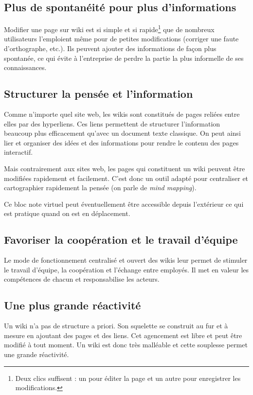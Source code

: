 \documentclass{article}
\begin{document}
\subsection{Plus de spontanéité pour plus d'informations}
Modifier une page sur wiki est si simple et si rapide\footnote{Deux clics suffisent : un pour éditer la page et un autre pour enregistrer les modifications.} que de nombreux utilisateurs l'emploient même pour de petites modifications (corriger une faute d'orthographe, etc.). Ils peuvent ajouter des informations de façon plus spontanée, ce qui évite à l'entreprise de perdre la partie la plus informelle de ses connaissances.

\subsection{Structurer la pensée et l'information}
Comme n'importe quel site web, les wikis sont constitués de pages reliées entre elles par des hyperliens. Ces liens permettent de structurer l'information beaucoup plus efficacement qu'avec un document texte classique. On peut ainsi lier et organiser des idées et des informations pour rendre le contenu des pages interactif.

Mais contrairement aux sites web, les pages qui constituent un wiki peuvent être modifiées rapidement et facilement. C'est donc un outil adapté pour centraliser et cartographier rapidement la pensée (on parle de \emph{mind mapping}).

Ce bloc note virtuel peut éventuellement être accessible depuis l'extérieur ce qui est pratique quand on est en déplacement.

\subsection{Favoriser la coopération et le travail d'équipe}
Le mode de fonctionnement centralisé et ouvert des wikis leur permet de stimuler le travail d'équipe, la coopération et l'échange entre employés. Il met en valeur les compétences de chacun et responsabilise les acteurs.

\subsection{Une plus grande réactivité}
Un wiki n'a pas de structure a priori. Son squelette se construit au fur et à mesure en ajoutant des pages et des liens. Cet agencement est libre et peut être modifié à tout moment. Un wiki est donc très malléable et cette souplesse permet une grande réactivité.
\end{document}
